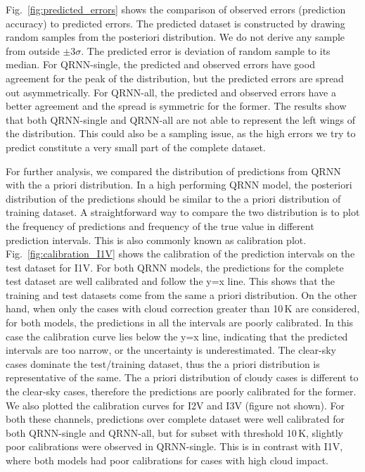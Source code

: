 \documentclass[amt, manuscript]{copernicus}
\begin{document}
Fig.~\ref{fig:predicted_errors} shows the comparison of observed errors (prediction accuracy) to predicted errors. The predicted dataset is constructed by drawing random samples from the posteriori distribution. We do not derive any sample from outside $\pm3\sigma$.  The predicted error is deviation of random sample to its median. For QRNN-single, the predicted and observed errors have good agreement for the peak of the distribution, but the predicted errors are spread out asymmetrically. For QRNN-all, the predicted and observed errors have a better agreement and the spread is symmetric for the former. The results show that both QRNN-single and QRNN-all are not able to represent the left wings of the distribution. This could also be a sampling issue, as the high errors we try to predict constitute a very small part of the complete dataset.  

For further analysis, we compared the distribution of predictions from QRNN with the a priori distribution. In a  high performing QRNN model, the posteriori distribution of the predictions should be similar to the a priori distribution of training dataset. A straightforward way to compare the two distribution is to plot the frequency of predictions and frequency of the true value in different prediction intervals. This is also commonly known as calibration plot. Fig.~\ref{fig:calibration_I1V} shows the calibration of the prediction intervals on the test dataset for I1V. For both QRNN models, the predictions for the complete test dataset are well calibrated and follow the y=x line. This shows that the training and test datasets come from the same a priori distribution. On the other hand, when only the cases with  cloud correction greater than 10\,K are considered, for both models, the predictions in all the intervals are poorly calibrated. In this case the calibration curve lies below the y=x line, indicating that the predicted intervals are too narrow, or the uncertainty is underestimated. The clear-sky cases dominate the test/training dataset, thus the a priori distribution is representative of the same. The a priori distribution of cloudy cases is different to the clear-sky cases, therefore the predictions are poorly calibrated for the former. We also plotted the calibration curves for I2V and I3V (figure not shown). For both these channels, predictions over complete dataset were well calibrated for both QRNN-single and QRNN-all, but for subset with threshold 10\,K, slightly poor calibrations were observed in QRNN-single. This is in contrast with I1V, where both models had poor calibrations for cases with high cloud impact. 
\end{document}
